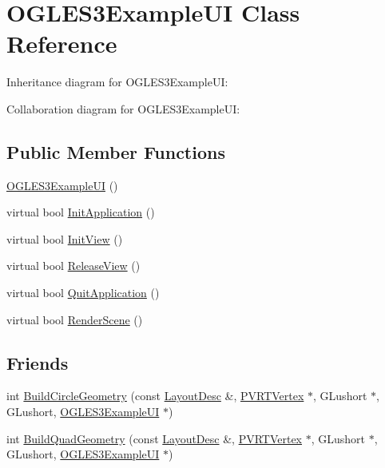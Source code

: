 \hypertarget{class_o_g_l_e_s3_example_u_i}{\section{O\+G\+L\+E\+S3\+Example\+U\+I Class Reference}
\label{class_o_g_l_e_s3_example_u_i}
}


Inheritance diagram for O\+G\+L\+E\+S3\+Example\+U\+I\+:


Collaboration diagram for O\+G\+L\+E\+S3\+Example\+U\+I\+:
\subsection*{Public Member Functions}
\begin{DoxyCompactItemize}
\item 
\hyperlink{class_o_g_l_e_s3_example_u_i_a021f7c3dad3dc36b2d8b54413c98fb74}{O\+G\+L\+E\+S3\+Example\+U\+I} ()
\item 
virtual bool \hyperlink{class_o_g_l_e_s3_example_u_i_a765525ff48681e698d16076100ba9bea}{Init\+Application} ()
\item 
virtual bool \hyperlink{class_o_g_l_e_s3_example_u_i_aae6011cd7f1fef7fa50f0a0c91a7c361}{Init\+View} ()
\item 
virtual bool \hyperlink{class_o_g_l_e_s3_example_u_i_aa510e4d3edb9948e3ac8fbca2d0f830d}{Release\+View} ()
\item 
virtual bool \hyperlink{class_o_g_l_e_s3_example_u_i_ade924af295480169f68f74708ca3ee5d}{Quit\+Application} ()
\item 
virtual bool \hyperlink{class_o_g_l_e_s3_example_u_i_a4cfc9bbc4cbae71f8e41cada5ced1726}{Render\+Scene} ()
\end{DoxyCompactItemize}
\subsection*{Friends}
\begin{DoxyCompactItemize}
\item 
int \hyperlink{class_o_g_l_e_s3_example_u_i_a7a05857af0bb67668508fb5a0ba2cce8}{Build\+Circle\+Geometry} (const \hyperlink{struct_layout_desc}{Layout\+Desc} \&, \hyperlink{struct_p_v_r_t_vertex}{P\+V\+R\+T\+Vertex} $\ast$, G\+Lushort $\ast$, G\+Lushort, \hyperlink{class_o_g_l_e_s3_example_u_i}{O\+G\+L\+E\+S3\+Example\+U\+I} $\ast$)
\item 
int \hyperlink{class_o_g_l_e_s3_example_u_i_a3766cd400d55e1b24f5c965c600b66f5}{Build\+Quad\+Geometry} (const \hyperlink{struct_layout_desc}{Layout\+Desc} \&, \hyperlink{struct_p_v_r_t_vertex}{P\+V\+R\+T\+Vertex} $\ast$, G\+Lushort $\ast$, G\+Lushort, \hyperlink{class_o_g_l_e_s3_example_u_i}{O\+G\+L\+E\+S3\+Example\+U\+I} $\ast$)
\end{DoxyCompactItemize}


